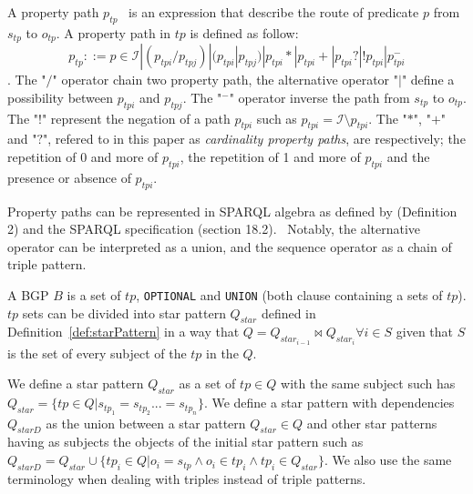 \begin{definition}\label{def:propertyPath}
   A property path $p_{tp}$~\cite{Kostylev2015} is an expression that describe the route of predicate $p$ from $s_{tp}$ to $o_{tp}$.
   A property path in $tp$ is defined as follow:
   \begin{equation}
    p_{tp} ::= p \in \mathcal{I} | (p_{tpi}/p_{tpj}) | (p_{tpi}|p_{tpj}) | p_{tpi}* | p_{tpi}+ | p_{tpi}? | !p_{tpi}| p_{tpi}^{-}
   \end{equation}.
   The "$/$" operator chain two property path, the alternative operator "$|$" define a possibility between $p_{tpi}$ and $p_{tpj}$.
   The "$^-$" operator inverse the path from $s_{tp}$ to $o_{tp}$.
   The "$!$" represent the negation of a path $p_{tpi}$ such as $p_{tpi} = \mathcal{I} \setminus p_{tpi}$.
   The "$*$", "$+$" and "$?$", refered to in this paper as \emph{cardinality property paths}, are respectively; the repetition of 0 and more of $p_{tpi}$, 
   the repetition of 1 and more of $p_{tpi}$ and the presence or absence of $p_{tpi}$.
\end{definition}

Property paths can be represented in SPARQL algebra as defined by \citeauthor{Kostylev2015} (Definition 2) and the SPARQL specification (section 18.2).~
Notably, the alternative operator can be interpreted as a union, and the sequence operator as a chain of triple pattern.

\begin{definition}[BGP]\label{def:bgp}
 A BGP $B$ is a set of $tp$, \texttt{OPTIONAL} and \texttt{UNION} (both clause containing a sets of $tp$).
 $tp$ sets can be divided into star pattern $Q_{star}$ defined in Definition~\ref{def:starPattern} in a way 
 that $Q = Q_{star_{i-1}} \bowtie Q_{star_i} \forall i \in S$ given that $S$ is the set of every subject of the $tp$ in the $Q$.
\end{definition}


\begin{definition}\label{def:starPattern}
We define a star pattern $Q_{star}$ as a set of $tp \in Q$ with the same subject such has $Q_{star} = \{ tp\in Q| s_{tp_1} = s_{tp_2} ... = s_{tp_n}\}$.
We define a star pattern with dependencies $Q_{starD}$ as the union between a star pattern $Q_{star} \in Q$ and other star patterns having as subjects
the objects of the initial star pattern such as $Q_{starD} = Q_{star} \cup \{tp_i \in Q| o_{i} = s_{tp} \land o_{i}\in tp_i \land tp_i  \in Q_{star}\}$.
We also use the same terminology when dealing with triples instead of triple patterns.
\end{definition}

